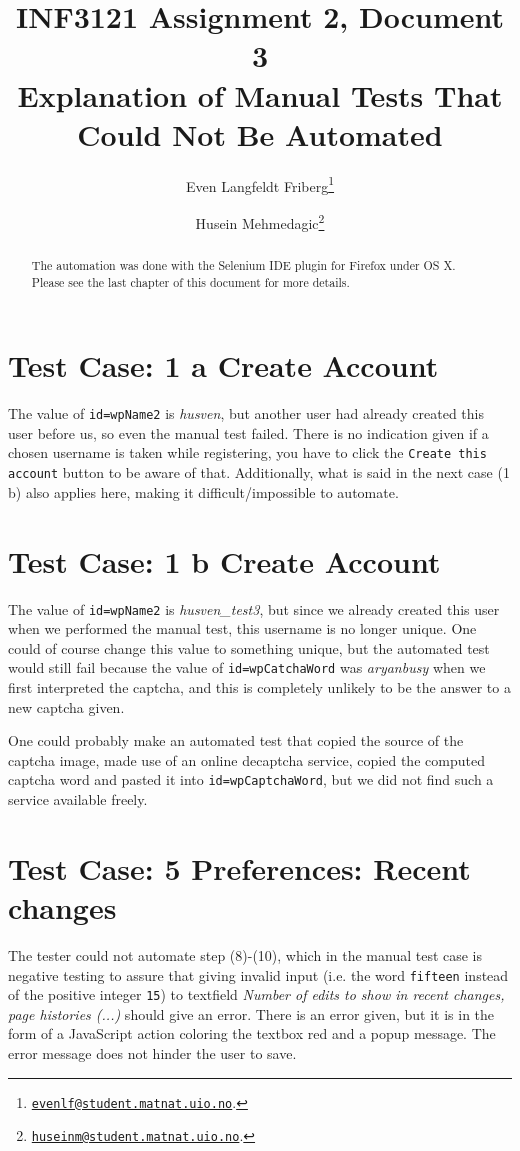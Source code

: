 \documentclass[a4paper,10pt]{article}
\title{INF3121 Assignment 2, Document 3 \\ Explanation of Manual Tests That Could Not Be Automated}
\author{
Even Langfeldt Friberg\footnote{\href{mailto:evenlf@student.matnat.uio.no}{\nolinkurl{evenlf@student.matnat.uio.no}}.}
\and Husein Mehmedagic\footnote{\href{mailto:huseinm@student.matnat.uio.no}{\nolinkurl{huseinm@student.matnat.uio.no}}.}
}
\begin{document}
\maketitle

\renewcommand{\abstractname}{Please note.}
\begin{abstract}
The automation was done with the Selenium IDE plugin for Firefox under OS X. Please see the last chapter of this document for more details.
\end{abstract}

\section*{Test Case: 1 a Create Account}

The value of \texttt{id=wpName2} is \textit{husven}, but another user had already created this user before us, so even the manual test failed. There is no 
indication given if a chosen username is taken while registering, you have to click the \texttt{Create this account} button to be aware of that. Additionally, 
what is said in the next case (1 b) also applies here, making it difficult/impossible to automate.

\section*{Test Case: 1 b Create Account}
The value of \texttt{id=wpName2} is \textit{husven\_test3}, but since we already created this user when we performed the manual test, this username is 
no longer unique. One could of course 
change this value to something unique, but the automated test would still fail because the value of \texttt{id=wpCatchaWord} was \textit{aryanbusy} when we first 
interpreted the captcha, and this is completely unlikely to be the answer to a new captcha given.

One could probably make an automated test that copied the source of the captcha image, made use of an online decaptcha service, copied the computed captcha word 
and pasted it into \texttt{id=wpCaptchaWord}, but we did not find such a service available freely.

\section*{Test Case: 5 Preferences: Recent changes}

The tester could not automate step (8)-(10), which in the manual test case is negative testing to assure that giving invalid input (i.e. the word \texttt{fifteen} 
instead of the positive integer \texttt{15}) to textfield \textit{Number of edits to show in recent changes, page histories (...)} should give an error. 
There is an error given, but it is in the form of a JavaScript action coloring the textbox red and a popup message. The error message does not hinder the user to 
save.
\end{document}
